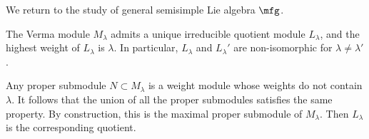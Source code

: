 \begin{comment}
\proof
	We only need to classify all submodules of $M_l$. Suppose $M_l$ contains a proper nonzero submodule $N$. Then $N$ is a weight module. Let $l'$ be the highest weight of $N$. By the previous discussion, $l'=l-2n$, $n>0$, and $v_{l'}:=f^n\cdot v_l$ is a weight vector.

	A direct calculation shows $e\cdot v_{l'}$ is a $(l'+2)$-weight vector, where $e:= \big(\begin{smallmatrix} 0 & 1\\ 0 & 0\end{smallmatrix}\big)$ generates $\mfn$. Hence we must have $e\cdot v_{l'}=0$. We have
	\[
		0 = e \cdot f^n\cdot v_l 
		= \sum_{1\le i\le n} f^{n-i} \cdot [e,f] \cdot f^{i-1} \cdot v_l + f^n \cdot e\cdot v_l.
	\]
	Note that $e\cdot v_l=0$. Also, $[e,f]=h$ and $h\cdot f^j = f^j \cdot h -2j f^{j}.$ We obtain
	\[
		0 = \sum_{1\le i\le n} ( f^{n-1} \cdot h - 2(i-1) f^{n-1} )\cdot v_l = n(l-n+1) f^{n-1}\cdot v_l.
	\]
	Note that $f^{n-1}\cdot v_l\neq 0$ because $f^n\cdot v_l\neq 0$. Hence we must have $l=n-1$ and $l'=-l-2$.

	This shows $M_l$ is irreducible unless $l\in \mBZ^{\ge 0}$. In the latter case, $M_l$ has a unique proper nonzero submodule $N$, and the highest weight of $N$ is $-l-2$. Since $e\cdot v_{-l-2}=0$, we have a nonzero $\mfb$-linear map $k^{-l-2} \to N$ given by the vector $v_{-l-2}$. By adjunction, we obtain a nonzero $\mfg$-linear map $M_{-l-2} \to N$. We have already shown $M_{-l-2}$ is irreducible, hence this map is injective. Then it is an isomorphism by the uniqueness of the submodule $N$. Now the quotient $L_l:=M_l/M_{-l-2}$ has weights $-l,-l+2,\cdots,l$ and each weight space is 1-dimensional. Hence $V_l$ is finite-dimensional. It is irreducible because the uniqueness of the submodule $N$.




\qed
\end{comment}

We return to the study of general semisimple Lie algebra $\mfg$.

\begin{thm}
	The Verma module $M_\lambda$ admits a unique irreducible quotient module $L_\lambda$, and the highest weight of $L_\lambda$ is $\lambda$. In particular, $L_\lambda$ and $L_\lambda'$ are non-isomorphic for $\lambda\neq \lambda'$.
\end{thm}

\proof
	Any proper submodule $N\subset M_\lambda$ is a weight module whose weights do not contain $\lambda$. It follows that the union of all the proper submodules satisfies the same property. By construction, this is the maximal proper submodule of $M_\lambda$. Then $L_\lambda$ is the corresponding quotient.


